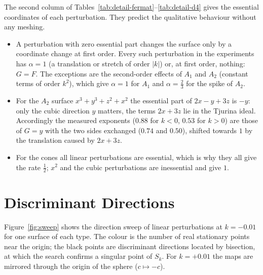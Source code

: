 The second column of Tables~\ref{tab:detail-fermat}--\ref{tab:detail-d4}
gives the essential coordinates of each perturbation. They predict the
qualitative behaviour without any meshing.
\begin{itemize}
    \item A perturbation with zero essential part changes the surface only by
          a coordinate change at first order. Every such perturbation in the
          experiments has $\alpha=1$ (a translation or stretch of order $|k|$)
          or, at first order, nothing: $G=F$. The exceptions are the
          second-order effects of $A_1$ and $A_2$ (constant terms of order
          $k^2$), which give $\alpha=1$ for $A_1$ and $\alpha=\frac23$ for the
          spike of $A_2$.
    \item For the $A_2$ surface $x^3+y^3+z^2+x^2$ the essential part of
          $2x-y+3z$ is $-y$: only the cubic direction $y$ matters, the terms
          $2x+3z$ lie in the Tjurina ideal. Accordingly the measured exponents
          ($0.88$ for $k<0$, $0.53$ for $k>0$) are those of $G=y$ with the two
          sides exchanged ($0.74$ and $0.50$), shifted towards $1$ by the
          translation caused by $2x+3z$.
    \item For the cones all linear perturbations are essential, which is why
          they all give the rate $\frac12$; $x^2$ and the cubic perturbations are
          inessential and give $1$.
\end{itemize}

\section{Discriminant Directions}
\label{sec:exp-sweep}

Figure~\ref{fig:sweep} shows the direction sweep of linear perturbations at
$k=-0.01$ for one surface of each type. The colour is the number of real
stationary points near the origin; the black points are discriminant
directions located by bisection, at which the search confirms a singular point
of $S_k$. For $k=+0.01$ the maps are mirrored through the origin of the
sphere ($c\mapsto-c$).

